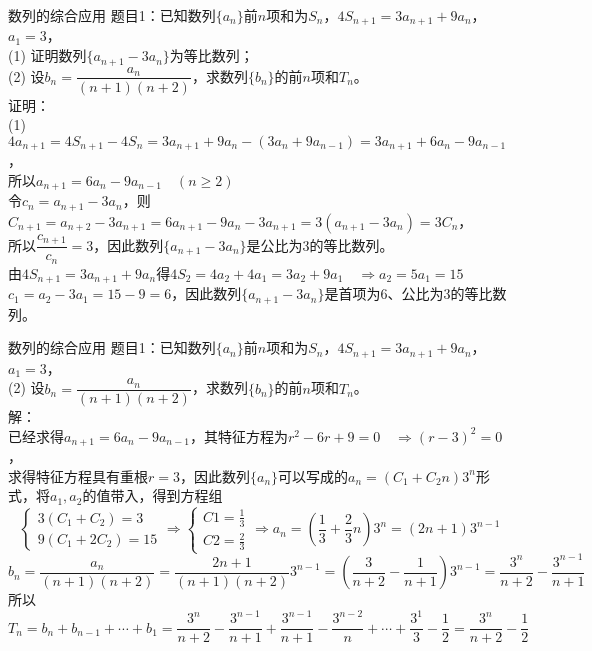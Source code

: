 \documentclass[aspectratio=169]{ctexbeamer} %
\date{\today}
\begin{document}
\begin{frame}[t]{数列的综合应用}
题目1：已知数列$\{  a_n \}$前$n$项和为$S_n$，$4S_{n+1} = 3a_{n+1} + 9a_n$，$a_1 = 3$， \\
(1) 证明数列$\{  a_{n+1} - 3a_n \}$为等比数列；\\
(2) 设$b_n = \dfrac{a_n}{(n+1)(n+2)}$，求数列$\{  b_n \}$的前$n$项和$T_n$。\\
\pause
证明：\\
(1) $4a_{n+1} = 4S_{n+1} - 4S_n = 3a_{n+1} + 9a_n - (3a_{n} + 9a_{n-1}) =  3a_{n+1} + 6a_n - 9a_{n-1}$，\\
\pause
所以$a_{n+1} = 6a_n - 9a_{n-1} \quad (n \geq 2)$ \\
\pause
令$c_n = a_{n+1} - 3a_n $，则$C_{n+1} = a_{n+2} - 3a_{n+1} = 6a_{n+1} - 9a_{n} - 3a_{n+1} = 3(a_{n+1} - 3a_{n}) = 3C_n$，\\
所以$\dfrac{c_{n+1}}{c_n} = 3$，因此数列$\{  a_{n+1} - 3a_n \}$是公比为3的等比数列。\\
\pause
由$4S_{n+1} = 3a_{n+1} + 9a_n$得$4S_2 = 4a_2 + 4a_1 = 3a_2 + 9a_1 \quad \Rightarrow a_2 = 5a_1 = 15$ \\
\pause
$c_1 = a_2 - 3a_1 = 15 - 9 = 6$，因此数列$\{  a_{n+1} - 3a_n \}$是首项为6、公比为3的等比数列。
\end{frame}

\begin{frame}[t]{数列的综合应用}
题目1：已知数列$\{  a_n \}$前$n$项和为$S_n$，$4S_{n+1} = 3a_{n+1} + 9a_n$，$a_1 = 3$， \\
(2) 设$b_n = \dfrac{a_n}{(n+1)(n+2)}$，求数列$\{  b_n \}$的前$n$项和$T_n$。\\
\pause
解：\\ 
已经求得$a_{n+1} = 6a_n - 9a_{n-1}$，其特征方程为$r^2 - 6r + 9 = 0 \quad \Rightarrow (r - 3)^2 = 0$，\\
\pause
求得特征方程具有重根$r = 3$，因此数列$\{ a_n \}$可以写成的$a_n = (C_1 + C_2 n)3^n$形式，将$a_1, a_2$的值带入，得到方程组\\
\pause
\[
\begin{cases}
3(C_1 + C_2) = 3 \\
9(C_1 + 2C_2) = 15
\end{cases}
\Rightarrow 
\begin{cases}
C1 = \frac{1}{3}\\
C2 = \frac{2}{3}
\end{cases}
\Rightarrow a_n = (\dfrac{1}{3} + \dfrac{2}{3}n)3^n = (2n+1)3^{n-1}
\]
\pause
$b_n = \dfrac{a_n}{(n+1)(n+2)} = \dfrac{2n+1}{(n+1)(n+2)} 3^{n-1} = \left (\dfrac{3}{n+2} - \dfrac{1}{n+1} \right ) 3^{n-1} =\dfrac{3^n}{n+2}  - \dfrac{3^{n-1} }{n+1}$ \\
\pause
所以$T_n = b_n + b_{n-1} + \cdots + b_1 = \dfrac{3^n}{n+2} - \dfrac{3^{n-1}}{n+1} + \dfrac{3^{n-1}}{n+1} - \dfrac{3^{n-2}}{n} + \cdots + \dfrac{3^1}{3} - \dfrac{1}{2} = \dfrac{3^n}{n+2} - \dfrac{1}{2}$
\end{frame}
\end{document}
